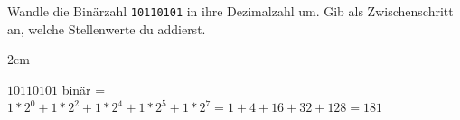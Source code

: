 \question[2]
Wandle die Binärzahl \texttt{10110101} in ihre Dezimalzahl um. 
Gib als Zwischenschritt an, welche Stellenwerte du addierst.

\begin{solutionbox}{2cm}

$10110101$ binär = $1*2^0 + 1*2^2 + 1*2^4 + 1*2^5 + 1*2^7 = 1 + 4 + 16 + 32 + 128 = 181$ 

\end{solutionbox}